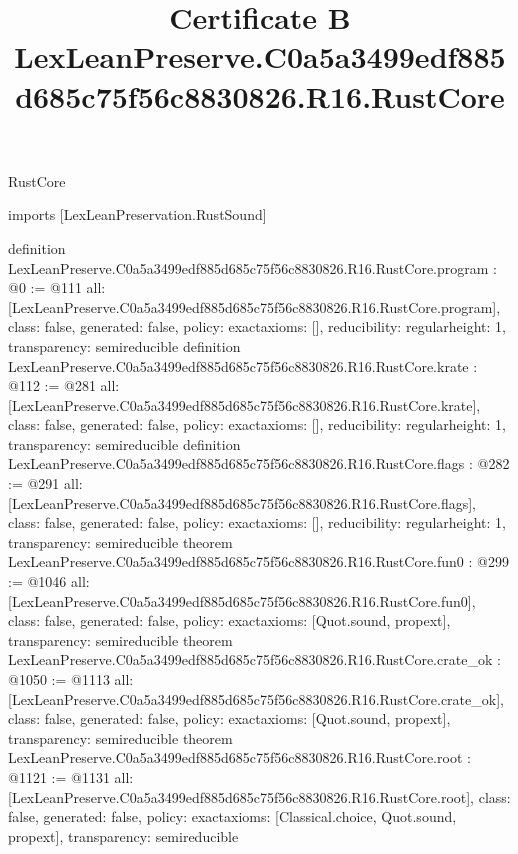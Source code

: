 \begin{lexlean}{RustCore}
\title{Certificate B LexLeanPreserve.C0a5a3499edf885d685c75f56c8830826.R16.RustCore}
\begin{coremodule}
imports [LexLeanPreservation.RustSound]

definition LexLeanPreserve.C0a5a3499edf885d685c75f56c8830826.R16.RustCore.program : @0 := @111 {
  all: [LexLeanPreserve.C0a5a3499edf885d685c75f56c8830826.R16.RustCore.program],
  class: false,
  generated: false,
  policy: exact{axioms: []},
  reducibility: regular{height: 1},
  transparency: semireducible
}
definition LexLeanPreserve.C0a5a3499edf885d685c75f56c8830826.R16.RustCore.krate : @112 := @281 {
  all: [LexLeanPreserve.C0a5a3499edf885d685c75f56c8830826.R16.RustCore.krate],
  class: false,
  generated: false,
  policy: exact{axioms: []},
  reducibility: regular{height: 1},
  transparency: semireducible
}
definition LexLeanPreserve.C0a5a3499edf885d685c75f56c8830826.R16.RustCore.flags : @282 := @291 {
  all: [LexLeanPreserve.C0a5a3499edf885d685c75f56c8830826.R16.RustCore.flags],
  class: false,
  generated: false,
  policy: exact{axioms: []},
  reducibility: regular{height: 1},
  transparency: semireducible
}
theorem LexLeanPreserve.C0a5a3499edf885d685c75f56c8830826.R16.RustCore.fun0 : @299 := @1046 {
  all: [LexLeanPreserve.C0a5a3499edf885d685c75f56c8830826.R16.RustCore.fun0],
  class: false,
  generated: false,
  policy: exact{axioms: [Quot.sound, propext]},
  transparency: semireducible
}
theorem LexLeanPreserve.C0a5a3499edf885d685c75f56c8830826.R16.RustCore.crate_ok : @1050 := @1113 {
  all: [LexLeanPreserve.C0a5a3499edf885d685c75f56c8830826.R16.RustCore.crate_ok],
  class: false,
  generated: false,
  policy: exact{axioms: [Quot.sound, propext]},
  transparency: semireducible
}
theorem LexLeanPreserve.C0a5a3499edf885d685c75f56c8830826.R16.RustCore.root : @1121 := @1131 {
  all: [LexLeanPreserve.C0a5a3499edf885d685c75f56c8830826.R16.RustCore.root],
  class: false,
  generated: false,
  policy: exact{axioms: [Classical.choice, Quot.sound, propext]},
  transparency: semireducible
}


\end{coremodule}
\end{lexlean}
